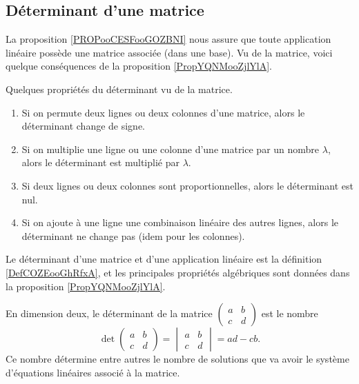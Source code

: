\subsection{Déterminant d'une matrice}

La proposition \ref{PROPooCESFooGOZBNI} nous assure que toute application linéaire possède une matrice associée (dans une base). Vu de la matrice, voici quelque conséquences de la proposition \ref{PropYQNMooZjlYlA}.
\begin{proposition}
    Quelques propriétés du déterminant vu de la matrice.
    \begin{enumerate}
        \item
            Si on permute deux lignes ou deux colonnes d'une matrice, alors le déterminant change de signe.
        \item
            Si on multiplie une ligne ou une colonne d'une matrice par un nombre $\lambda$, alors le déterminant est multiplié par $\lambda$.
        \item
            Si deux lignes ou deux colonnes sont proportionnelles, alors le déterminant est nul.
        \item
            Si on ajoute à une ligne une combinaison linéaire des autres lignes, alors le déterminant ne change pas (idem pour les colonnes).
    \end{enumerate}
\end{proposition}

Le déterminant d'une matrice et d'une application linéaire est la définition \ref{DefCOZEooGhRfxA}, et les principales propriétés algébriques sont données dans la proposition \ref{PropYQNMooZjlYlA}.

En dimension deux, le déterminant de la matrice
    $\begin{pmatrix}
        a    &   b    \\ 
        c    &   d    
    \end{pmatrix}$
est le nombre
\begin{equation}        \label{EQooQRGVooChwRMd}
     \det\begin{pmatrix}
         a   &   b    \\ 
         c   &   d    
     \end{pmatrix}=\begin{vmatrix}
          a  &   b    \\ 
        c    &   d    
    \end{vmatrix}=ad-cb.
\end{equation}
Ce nombre détermine entre autres le nombre de solutions que va avoir le système d'équations linéaires associé à la matrice.

